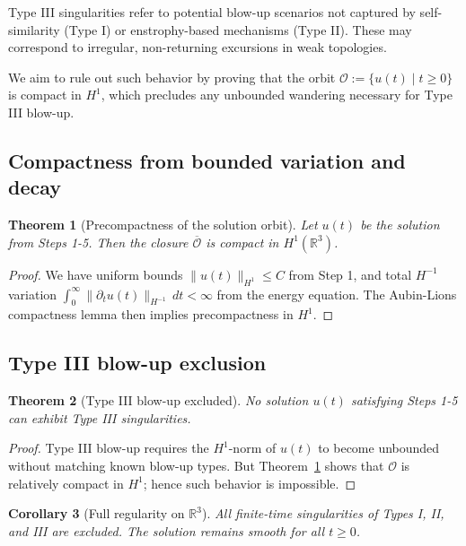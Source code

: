 \documentclass[11pt]{article}
\newtheorem{theorem}{Theorem}[section]
\newtheorem{corollary}[theorem]{Corollary}
\theoremstyle{definition}
\begin{document}
Type III singularities refer to potential blow-up scenarios not captured by self-similarity (Type I) or enstrophy-based mechanisms (Type II). These may correspond to irregular, non-returning excursions in weak topologies.

We aim to rule out such behavior by proving that the orbit $\mathcal O := \{ u(t) \mid t \ge 0 \}$ is compact in $H^1$, which precludes any unbounded wandering necessary for Type III blow-up.

\subsection{Compactness from bounded variation and decay}

\begin{theorem}[Precompactness of the solution orbit]\label{thm:compact}
Let $u(t)$ be the solution from Steps 1-5. Then the closure $\overline{\mathcal O}$ is compact in $H^1(\mathbb R^3)$.
\end{theorem}

\begin{proof}
We have uniform bounds $\|u(t)\|_{H^1} \le C$ from Step 1, and total $H^{-1}$ variation $\int_0^\infty \|\partial_t u(t)\|_{H^{-1}}\,dt < \infty$ from the energy equation. The Aubin-Lions compactness lemma then implies precompactness in $H^1$.
\end{proof}

\subsection{Type III blow-up exclusion}

\begin{theorem}[Type III blow-up excluded]\label{thm:typeIII}
No solution $u(t)$ satisfying Steps 1-5 can exhibit Type III singularities.
\end{theorem}

\begin{proof}
Type III blow-up requires the $H^1$-norm of $u(t)$ to become unbounded without matching known blow-up types. But Theorem~\ref{thm:compact} shows that $\mathcal O$ is relatively compact in $H^1$; hence such behavior is impossible.
\end{proof}

\begin{corollary}[Full regularity on $\mathbb{R}^3$]
All finite-time singularities of Types I, II, and III are excluded. The solution remains smooth for all $t \ge 0$.
\end{corollary}
\end{document}
